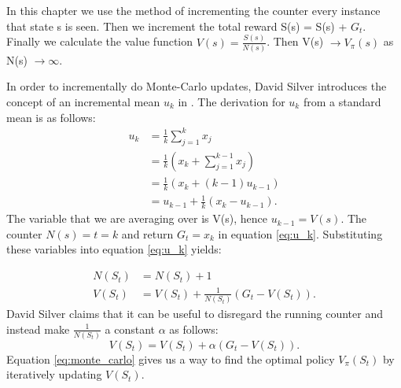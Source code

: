 In this chapter we use the method of incrementing the counter every instance that state s is seen.
Then we increment the total reward S(s) =  S(s) + $G_t$.
Finally we calculate the value function $V(s)=\frac{S(s)}{N(s)}$.
Then V(s) $\to V_\pi(s)$ as N(s) $\to \infty$.

In order to incrementally do Monte-Carlo updates, David Silver introduces the concept of an incremental mean $u_k$ in \cite{David_Silver}. The derivation for $u_k$ from a standard mean is as follows:
\begin{align}
	u_k &= \frac{1}{k}\sum_{j=1}^{k}x_j\\
	&= \frac{1}{k}(x_k + \sum_{j=1}^{k-1}x_j) \nonumber\\
	&= \frac{1}{k}(x_k +(k-1)u_{k-1})\nonumber\\
	&= u_{k-1} + \frac{1}{k}(x_k - u_{k-1}).
	\label{eq:u_k}
\end{align}
The variable that we are averaging over is V(s), hence $u_{k-1}=V(s)$. The counter $N(s)=t=k$ and return $G_t =x_k$ in equation \ref{eq:u_k}. Substituting these variables into equation \ref{eq:u_k} yields:

\begin{align}
	N(S_t) &= N(S_t) + 1 \\
	V(S_t) &= V(S_t) + \frac{1}{N(S_t)}(G_t - V(S_t)).
\end{align}
David Silver claims that it can be useful to disregard the running counter and instead make $\frac{1}{N(S_t)}$ a constant $\alpha$ as follows:
\begin{equation}
	V(S_t) = V(S_t) + \alpha(G_t - V(S_t)).
	\label{eq:monte_carlo}
\end{equation}
Equation \ref{eq:monte_carlo} gives us a way to find the optimal policy $V_\pi(S_t)$ by iteratively updating $V(S_t)$.

